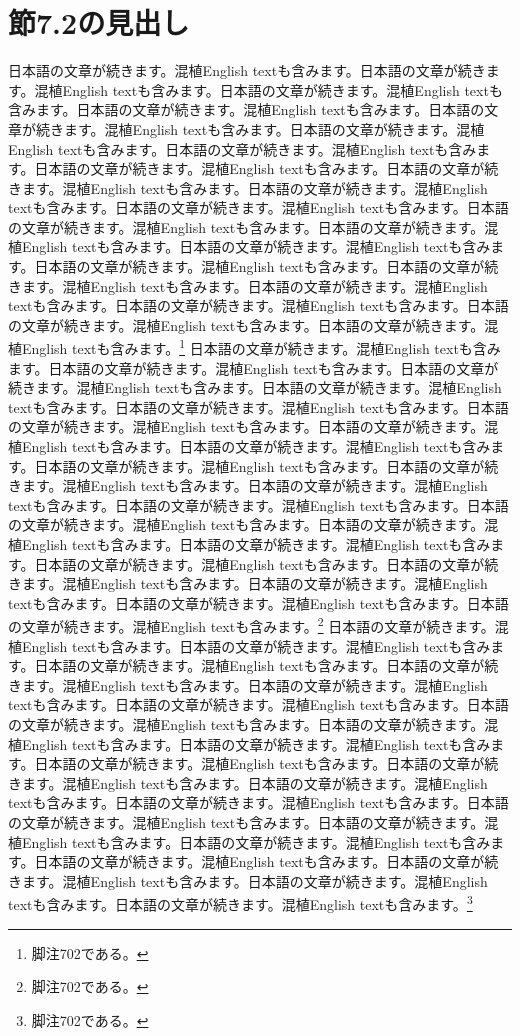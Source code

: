 \documentclass[pdflatex,book]{jlreq}
\begin{document}
\section{節7.2の見出し}
日本語の文章が続きます。混植English textも含みます。日本語の文章が続きます。混植English textも含みます。日本語の文章が続きます。混植English textも含みます。日本語の文章が続きます。混植English textも含みます。日本語の文章が続きます。混植English textも含みます。日本語の文章が続きます。混植English textも含みます。日本語の文章が続きます。混植English textも含みます。日本語の文章が続きます。混植English textも含みます。日本語の文章が続きます。混植English textも含みます。日本語の文章が続きます。混植English textも含みます。日本語の文章が続きます。混植English textも含みます。日本語の文章が続きます。混植English textも含みます。日本語の文章が続きます。混植English textも含みます。日本語の文章が続きます。混植English textも含みます。日本語の文章が続きます。混植English textも含みます。日本語の文章が続きます。混植English textも含みます。日本語の文章が続きます。混植English textも含みます。日本語の文章が続きます。混植English textも含みます。日本語の文章が続きます。混植English textも含みます。日本語の文章が続きます。混植English textも含みます。\footnote{脚注702である。}
日本語の文章が続きます。混植English textも含みます。日本語の文章が続きます。混植English textも含みます。日本語の文章が続きます。混植English textも含みます。日本語の文章が続きます。混植English textも含みます。日本語の文章が続きます。混植English textも含みます。日本語の文章が続きます。混植English textも含みます。日本語の文章が続きます。混植English textも含みます。日本語の文章が続きます。混植English textも含みます。日本語の文章が続きます。混植English textも含みます。日本語の文章が続きます。混植English textも含みます。日本語の文章が続きます。混植English textも含みます。日本語の文章が続きます。混植English textも含みます。日本語の文章が続きます。混植English textも含みます。日本語の文章が続きます。混植English textも含みます。日本語の文章が続きます。混植English textも含みます。日本語の文章が続きます。混植English textも含みます。日本語の文章が続きます。混植English textも含みます。日本語の文章が続きます。混植English textも含みます。日本語の文章が続きます。混植English textも含みます。日本語の文章が続きます。混植English textも含みます。\footnote{脚注702である。}
日本語の文章が続きます。混植English textも含みます。日本語の文章が続きます。混植English textも含みます。日本語の文章が続きます。混植English textも含みます。日本語の文章が続きます。混植English textも含みます。日本語の文章が続きます。混植English textも含みます。日本語の文章が続きます。混植English textも含みます。日本語の文章が続きます。混植English textも含みます。日本語の文章が続きます。混植English textも含みます。日本語の文章が続きます。混植English textも含みます。日本語の文章が続きます。混植English textも含みます。日本語の文章が続きます。混植English textも含みます。日本語の文章が続きます。混植English textも含みます。日本語の文章が続きます。混植English textも含みます。日本語の文章が続きます。混植English textも含みます。日本語の文章が続きます。混植English textも含みます。日本語の文章が続きます。混植English textも含みます。日本語の文章が続きます。混植English textも含みます。日本語の文章が続きます。混植English textも含みます。日本語の文章が続きます。混植English textも含みます。日本語の文章が続きます。混植English textも含みます。\footnote{脚注702である。}
\end{document}
